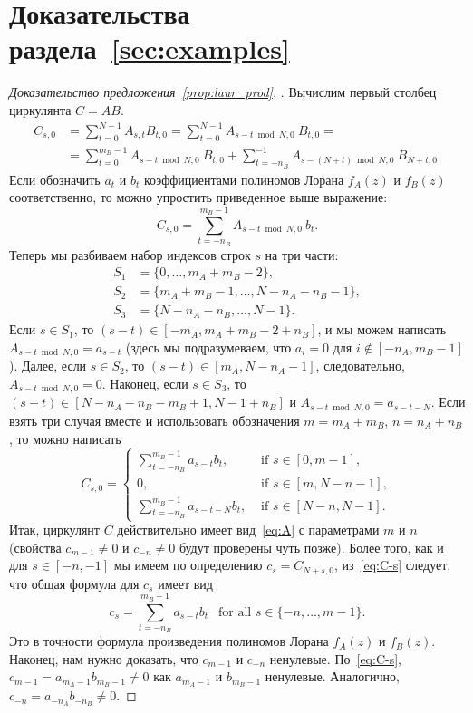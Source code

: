 \section{Доказательства раздела~\ref{sec:examples}} \label{app:examples}


\begin{proof}[Доказательство предложения~\ref{prop:laur_prod}].
	Вычислим первый столбец циркулянта $C = AB$.
	\begin{align*}
	C_{s,0}
	&=
	\sum_{t=0}^{N-1} A_{s,t}B_{t,0}
	=
	\sum_{t=0}^{N-1} A_{s-t \bmod N,0}~B_{t,0}
	= \\ &=
	\sum_{t=0}^{m_B-1} A_{s-t \bmod N,0}~B_{t,0}
	+
	\sum_{t=-n_B}^{-1} A_{s-(N+t) \bmod N,0}~B_{N+t,0}.
	\end{align*}
	Если обозначить $a_t$ и $b_t$ коэффициентами полиномов Лорана $f_A(z)$ и $f_B(z)$ соответственно, то можно упростить приведенное выше выражение:
	\[
	C_{s, 0} = \sum_{t=-n_B}^{m_B-1} A_{s-t \bmod N,0}~b_t.
	\]
	Теперь мы разбиваем набор индексов строк $s$ на три части:
	\begin{align*}
	S_1 &= \{0, \dots, m_A+m_B-2\},\\
	S_2 &= \{m_A+m_B-1, \dots, N-n_A-n_B-1\}, \\
	S_3 &=\{N-n_A-n_B,\dots,N-1\}.    
	\end{align*}
	Если $s \in S_1$, то $(s-t) \in [-m_A, m_A+m_B-2+n_B]$, и мы можем написать $A_{s-t \bmod N, 0} = a_{s-t}$ (здесь мы подразумеваем, что $a_i = 0$ для $i \not\in [-n_A, m_B-1]$).
	Далее, если $s \in S_2$, то $(s-t) \in [m_A, N-n_A-1]$, следовательно, $A_{s-t \bmod N,0} = 0$.
	Наконец, если $s \in S_3$, то $(s-t) \in [N-n_A-n_B-m_B+1, N-1+n_B]$ и $A_{s-t \bmod N, 0} = a_{s-t-N}$.
	Если взять три случая вместе и использовать обозначения $m = m_A + m_B$, $n=n_A + n_B$, то можно написать
	\begin{equation}\label{eq:C-s}
	C_{s,0} = \begin{cases}
	\sum_{t=-n_B}^{m_B-1} a_{s-t}b_t,
	&\text{ if } s \in [0, m-1],\\
	0, &\text{ if } s \in [m, N-n-1], \\
	\sum_{t=-n_B}^{m_B-1} a_{s-t-N}b_t, & \text{ if } s \in [N-n, N-1].
	\end{cases}
	\end{equation}
	Итак, циркулянт $C$ действительно имеет вид~\eqref{eq:A} с параметрами $m$ и $n$ (свойства $c_{m-1} \neq 0$ и $c_{-n} \neq 0$ будут проверены чуть позже).
	Более того, как и для $s \in [-n,-1]$ мы имеем по определению
	$c_s = C_{N+s, 0}$, из~\eqref{eq:C-s} следует, что общая формула для $c_s$ имеет вид
	\[
	c_s = \sum_{t=-n_B}^{m_B-1} a_{s-t}b_t~~\text{ for all } s \in \{-n, \dots, m-1\}.
	\]
	Это в точности формула произведения полиномов Лорана $f_A(z)$ и $f_B(z)$.
	Наконец, нам нужно доказать, что $c_{m-1}$ и $c_{-n}$ ненулевые.
	По~\eqref{eq:C-s}, $c_{m-1} = a_{m_A-1}b_{m_B-1} \neq 0$ как $a_{m_A-1}$ и $b_{m_B-1}$ ненулевые.
	Аналогично, $c_{-n} = a_{-n_A}b_{-n_B} \neq 0$.
\end{proof}




